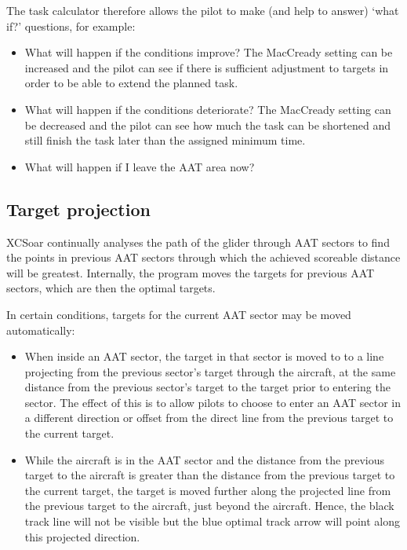 \documentclass[a4paper,12pt]{refrep}
\begin{document}
The task calculator therefore allows the pilot to make (and help to
answer) `what if?' questions, for example:
\begin{itemize}
\item What will happen if the conditions improve?  The MacCready setting can be increased and the pilot can see if there is sufficient adjustment to targets in order to be able to extend the planned task.
\item What will happen if the conditions deteriorate?  The MacCready setting can be decreased and the pilot can see how much the task can be shortened and still finish the task later than the assigned minimum time.
\item What will happen if I leave the AAT area now?
\end{itemize}

\subsection*{Target projection}

XCSoar continually analyses the path of the glider through AAT sectors
to find the points in previous AAT sectors through which the achieved
scoreable distance will be greatest.  Internally, the program moves
the targets for previous AAT sectors, which are then the optimal
targets.

In certain conditions, targets for the current AAT sector may be moved
automatically:
\begin{itemize}
\item When inside an AAT sector, the target in that sector is moved to
to a line projecting from the previous sector's target through the
aircraft, at the same distance from the previous sector's target to
the target prior to entering the sector.  The effect of this is to
allow pilots to choose to enter an AAT sector in a different direction
or offset from the direct line from the previous target to the current
target.

\item While the aircraft is in the AAT sector and the distance from the
previous target to the aircraft is greater than the distance from the
previous target to the current target, the target is moved further
along the projected line from the previous target to the aircraft,
just beyond the aircraft.  Hence, the black track line will not be
visible but the blue optimal track arrow will point along this
projected direction.
\end{itemize}
\end{document}
